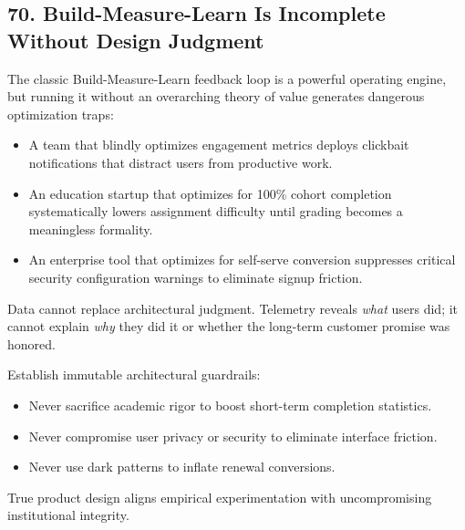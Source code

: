 \subsection*{70. Build-Measure-Learn Is Incomplete Without Design Judgment}

The classic Build-Measure-Learn feedback loop is a powerful operating engine, but running it without an overarching theory of value generates dangerous optimization traps:
\begin{itemize}
    \item A team that blindly optimizes engagement metrics deploys clickbait notifications that distract users from productive work.
    \item An education startup that optimizes for 100\% cohort completion systematically lowers assignment difficulty until grading becomes a meaningless formality.
    \item An enterprise tool that optimizes for self-serve conversion suppresses critical security configuration warnings to eliminate signup friction.
\end{itemize}

Data cannot replace architectural judgment. Telemetry reveals \emph{what} users did; it cannot explain \emph{why} they did it or whether the long-term customer promise was honored.

Establish immutable architectural guardrails:
\begin{itemize}
    \item Never sacrifice academic rigor to boost short-term completion statistics.
    \item Never compromise user privacy or security to eliminate interface friction.
    \item Never use dark patterns to inflate renewal conversions.
\end{itemize}

True product design aligns empirical experimentation with uncompromising institutional integrity.

